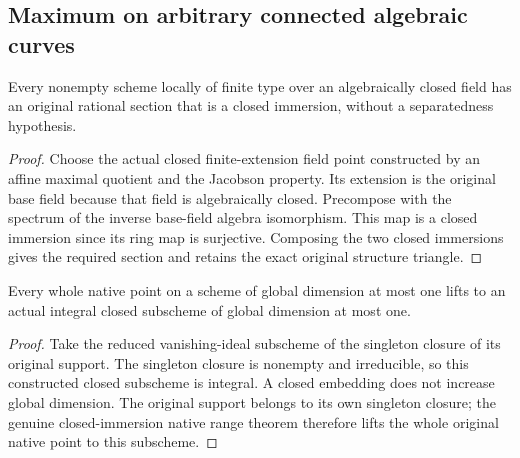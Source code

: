 \subsection{Maximum on arbitrary connected algebraic curves}

\begin{lemma}
\label{lem:fc-closed-rational-section}
\leanok
Every nonempty scheme locally of finite type over an algebraically closed
field has an original rational section that is a closed immersion, without
a separatedness hypothesis.
\end{lemma}
\begin{proof}
Choose the actual closed finite-extension field point constructed by an
affine maximal quotient and the Jacobson property. Its extension is the
original base field because that field is algebraically closed. Precompose
with the spectrum of the inverse base-field algebra isomorphism. This map
is a closed immersion since its ring map is surjective. Composing the two
closed immersions gives the required section and retains the exact original
structure triangle.
\end{proof}

\begin{lemma}
\label{lem:fc-integral-closed-curve-support-lift}
\leanok
Every whole native point on a scheme of global dimension at most one lifts
to an actual integral closed subscheme of global dimension at most one.
\end{lemma}
\begin{proof}
Take the reduced vanishing-ideal subscheme of the singleton closure of its
original support. The singleton closure is nonempty and irreducible, so this
constructed closed subscheme is integral. A closed embedding does not increase
global dimension. The original support belongs to its own singleton closure;
the genuine closed-immersion native range theorem therefore lifts the whole
original native point to this subscheme.
\end{proof}

